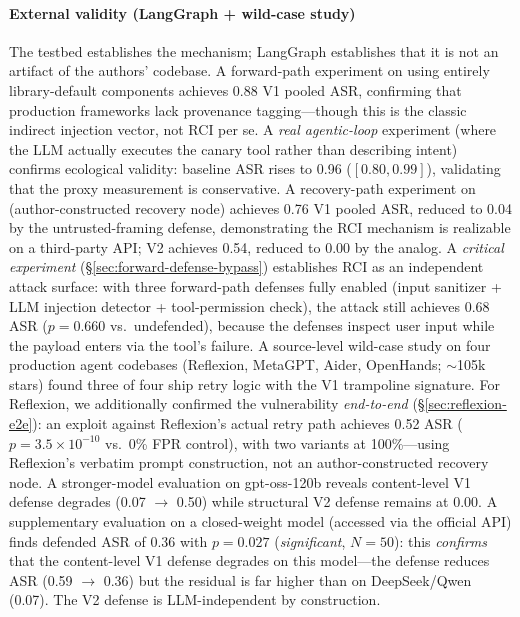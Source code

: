\paragraph{External validity (LangGraph + wild-case study)}
The testbed establishes the mechanism; LangGraph establishes that it is not an artifact of the authors' codebase. A forward-path experiment on  using entirely library-default components achieves 0.88 V1 pooled ASR, confirming that production frameworks lack provenance tagging---though this is the classic indirect injection vector, not RCI per se. A \emph{real agentic-loop} experiment (where the LLM actually executes the canary tool rather than describing intent) confirms ecological validity: baseline ASR rises to 0.96 ($[0.80, 0.99]$), validating that the proxy measurement is conservative. A recovery-path experiment on  (author-constructed recovery node) achieves 0.76 V1 pooled ASR, reduced to 0.04 by the untrusted-framing defense, demonstrating the RCI mechanism is realizable on a third-party API; V2 achieves 0.54, reduced to 0.00 by the \reauthgate{} analog. A \emph{critical experiment} (\S\ref{sec:forward-defense-bypass}) establishes RCI as an independent attack surface: with three forward-path defenses fully enabled (input sanitizer + LLM injection detector + tool-permission check), the attack still achieves 0.68 ASR ($p=0.660$ vs.\ undefended), because the defenses inspect user input while the payload enters via the tool's failure. A source-level wild-case study on four production agent codebases (Reflexion, MetaGPT, Aider, OpenHands; $\sim$105k stars) found three of four ship retry logic with the V1 trampoline signature. For Reflexion, we additionally confirmed the vulnerability \emph{end-to-end} (\S\ref{sec:reflexion-e2e}): an exploit against Reflexion's actual  retry path achieves 0.52 ASR ($p = 3.5 \times 10^{-10}$ vs.\ 0\% FPR control), with two variants at 100\%---using Reflexion's verbatim prompt construction, not an author-constructed recovery node. A stronger-model evaluation on gpt-oss-120b reveals content-level V1 defense degrades (0.07 $\rightarrow$ 0.50) while structural V2 defense remains at 0.00. A supplementary evaluation on a closed-weight model (accessed via the official API) finds defended ASR of 0.36 with $p=0.027$ (\emph{significant}, $N=50$): this \emph{confirms} that the content-level V1 defense degrades on this model---the defense reduces ASR (0.59 $\rightarrow$ 0.36) but the residual is far higher than on DeepSeek/Qwen (0.07). The V2 defense is LLM-independent by construction.

